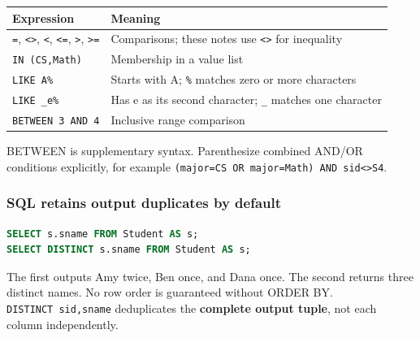 \begin{longtable}[]{@{}
  >{\raggedright\arraybackslash}p{}
  >{\raggedright\arraybackslash}p{}@{}}
\toprule\noalign{}
\begin{minipage}[b]{\linewidth}\raggedright
Expression
\end{minipage} & \begin{minipage}[b]{\linewidth}\raggedright
Meaning
\end{minipage} \\
\midrule\noalign{}
\endhead
\bottomrule\noalign{}
\endlastfoot
\texttt{=}, \texttt{\textless{}\textgreater{}}, \texttt{\textless{}}, \texttt{\textless{}=}, \texttt{\textgreater{}}, \texttt{\textgreater{}=} & Comparisons; these notes use \texttt{\textless{}\textgreater{}} for inequality \\
\texttt{IN\ (\textquotesingle{}CS\textquotesingle{},\textquotesingle{}Math\textquotesingle{})} & Membership in a value list \\
\texttt{LIKE\ \textquotesingle{}A\%\textquotesingle{}} & Starts with A; \texttt{\%} matches zero or more characters \\
\texttt{LIKE\ \textquotesingle{}\_e\%\textquotesingle{}} & Has e as its second character; \texttt{\_} matches one character \\
\texttt{BETWEEN\ 3\ AND\ 4} & Inclusive range comparison \\
\end{longtable}

BETWEEN is supplementary syntax. Parenthesize combined AND/OR conditions explicitly, for example \texttt{(major=\textquotesingle{}CS\textquotesingle{}\ OR\ major=\textquotesingle{}Math\textquotesingle{})\ AND\ sid\textless{}\textgreater{}\textquotesingle{}S4\textquotesingle{}}.

\subsubsection{SQL retains output duplicates by default}\label{06_sql_queries_en-sql-retains-output-duplicates-by-default}

\Needspace{60pt}
\begin{lstlisting}[language=SQL]
SELECT s.sname FROM Student AS s;
SELECT DISTINCT s.sname FROM Student AS s;
\end{lstlisting}

The first outputs Amy twice, Ben once, and Dana once. The second returns three distinct names. No row order is guaranteed without ORDER BY. \texttt{DISTINCT\ sid,\allowbreak{}sname} deduplicates the \textbf{complete output tuple}, not each column independently.

